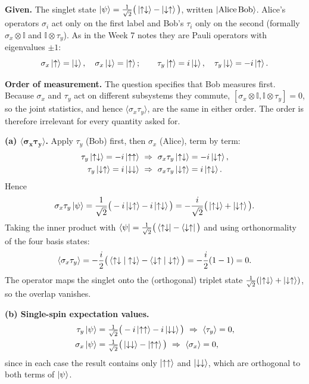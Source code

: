 \documentclass[12pt]{article}
\newif\ifsolutions
\begin{document}
\ifsolutions
\begin{solutionbox}
\textbf{Given.} The singlet state $\ket{\psi}=\frac{1}{\sqrt2}\big(\ket{\uparrow\downarrow}-\ket{\downarrow\uparrow}\big)$, written $\ket{\text{Alice}\,\text{Bob}}$. Alice's operators $\sigma_i$ act only on the first label and Bob's $\tau_i$ only on the second (formally $\sigma_x\otimes\mathbb{I}$ and $\mathbb{I}\otimes\tau_y$). As in the Week 7 notes they are Pauli operators with eigenvalues $\pm1$:
\[
\sigma_x\ket{\uparrow}=\ket{\downarrow},\quad\sigma_x\ket{\downarrow}=\ket{\uparrow};\qquad
\tau_y\ket{\uparrow}=i\ket{\downarrow},\quad\tau_y\ket{\downarrow}=-i\ket{\uparrow}.
\]

\textbf{Order of measurement.} The question specifies that Bob measures first. Because $\sigma_x$ and $\tau_y$ act on different subsystems they commute, $[\sigma_x\otimes\mathbb{I},\mathbb{I}\otimes\tau_y]=0$, so the joint statistics, and hence $\langle\sigma_x\tau_y\rangle$, are the same in either order. The order is therefore irrelevant for every quantity asked for.

\textbf{(a) $\boldsymbol{\langle\sigma_x\tau_y\rangle}$.} Apply $\tau_y$ (Bob) first, then $\sigma_x$ (Alice), term by term:
\begin{align*}
\tau_y\ket{\uparrow\downarrow}=-i\ket{\uparrow\uparrow}&\ \Rightarrow\ \sigma_x\tau_y\ket{\uparrow\downarrow}=-i\ket{\downarrow\uparrow},\\
\tau_y\ket{\downarrow\uparrow}=i\ket{\downarrow\downarrow}&\ \Rightarrow\ \sigma_x\tau_y\ket{\downarrow\uparrow}=i\ket{\uparrow\downarrow}.
\end{align*}
Hence
\[
\sigma_x\tau_y\ket{\psi}=\frac{1}{\sqrt2}\big(-i\ket{\downarrow\uparrow}-i\ket{\uparrow\downarrow}\big)=-\frac{i}{\sqrt2}\big(\ket{\uparrow\downarrow}+\ket{\downarrow\uparrow}\big).
\]
Taking the inner product with $\bra{\psi}=\frac{1}{\sqrt2}\big(\bra{\uparrow\downarrow}-\bra{\downarrow\uparrow}\big)$ and using orthonormality of the four basis states:
\[
\langle\sigma_x\tau_y\rangle=-\frac{i}{2}\big(\braket{\uparrow\downarrow|\uparrow\downarrow}-\braket{\downarrow\uparrow|\downarrow\uparrow}\big)=-\frac{i}{2}(1-1)=0 .
\]
The operator maps the singlet onto the (orthogonal) triplet state $\frac{1}{\sqrt2}(\ket{\uparrow\downarrow}+\ket{\downarrow\uparrow})$, so the overlap vanishes.

\textbf{(b) Single-spin expectation values.}
\begin{align*}
\tau_y\ket{\psi}&=\tfrac{1}{\sqrt2}\big(-i\ket{\uparrow\uparrow}-i\ket{\downarrow\downarrow}\big)\ \Rightarrow\ \langle\tau_y\rangle=0,\\
\sigma_x\ket{\psi}&=\tfrac{1}{\sqrt2}\big(\ket{\downarrow\downarrow}-\ket{\uparrow\uparrow}\big)\ \Rightarrow\ \langle\sigma_x\rangle=0,
\end{align*}
since in each case the result contains only $\ket{\uparrow\uparrow}$ and $\ket{\downarrow\downarrow}$, which are orthogonal to both terms of $\ket{\psi}$.


\end{solutionbox}
\end{document}
